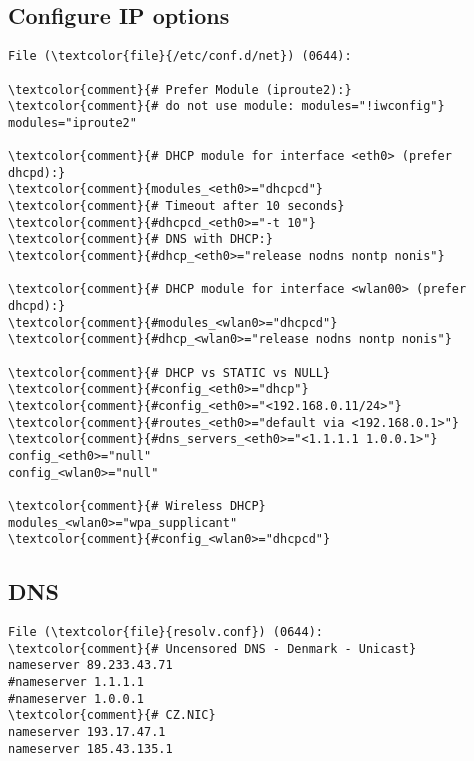 \documentclass[10pt, a4paper, onecolumn, openany]{book}         %
\begin{document}
\subsection{Configure IP options}
\begin{Verbatim}[commandchars=\\\{\}]
File (\textcolor{file}{/etc/conf.d/net}) (0644):

\textcolor{comment}{# Prefer Module (iproute2):}
\textcolor{comment}{# do not use module: modules="!iwconfig"}
modules="iproute2"

\textcolor{comment}{# DHCP module for interface <eth0> (prefer dhcpd):}
\textcolor{comment}{modules_<eth0>="dhcpcd"}
\textcolor{comment}{# Timeout after 10 seconds}
\textcolor{comment}{#dhcpcd_<eth0>="-t 10"}
\textcolor{comment}{# DNS with DHCP:}
\textcolor{comment}{#dhcp_<eth0>="release nodns nontp nonis"}

\textcolor{comment}{# DHCP module for interface <wlan00> (prefer dhcpd):}
\textcolor{comment}{#modules_<wlan0>="dhcpcd"}
\textcolor{comment}{#dhcp_<wlan0>="release nodns nontp nonis"}

\textcolor{comment}{# DHCP vs STATIC vs NULL}
\textcolor{comment}{#config_<eth0>="dhcp"}
\textcolor{comment}{#config_<eth0>="<192.168.0.11/24>"}
\textcolor{comment}{#routes_<eth0>="default via <192.168.0.1>"}
\textcolor{comment}{#dns_servers_<eth0>="<1.1.1.1 1.0.0.1>"}
config_<eth0>="null"
config_<wlan0>="null"

\textcolor{comment}{# Wireless DHCP}
modules_<wlan0>="wpa_supplicant"
\textcolor{comment}{#config_<wlan0>="dhcpcd"}
\end{Verbatim}



\subsection{DNS}
\begin{Verbatim}[commandchars=\\\{\}]
File (\textcolor{file}{resolv.conf}) (0644):
\textcolor{comment}{# Uncensored DNS - Denmark - Unicast}
nameserver 89.233.43.71
#nameserver 1.1.1.1
#nameserver 1.0.0.1
\textcolor{comment}{# CZ.NIC}
nameserver 193.17.47.1
nameserver 185.43.135.1
\end{Verbatim}
\end{document}
